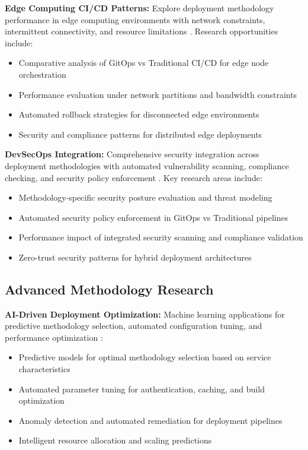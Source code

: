 \textbf{Edge Computing CI/CD Patterns:} Explore deployment methodology performance in edge computing environments with network constraints, intermittent connectivity, and resource limitations \cite{edge_computing,distributed_deployment}. Research opportunities include:
\begin{itemize}
\item Comparative analysis of GitOps vs Traditional CI/CD for edge node orchestration
\item Performance evaluation under network partitions and bandwidth constraints
\item Automated rollback strategies for disconnected edge environments
\item Security and compliance patterns for distributed edge deployments
\end{itemize}

\textbf{DevSecOps Integration:} Comprehensive security integration across deployment methodologies with automated vulnerability scanning, compliance checking, and security policy enforcement \cite{devsecops,security_automation}. Key research areas include:
\begin{itemize}
\item Methodology-specific security posture evaluation and threat modeling
\item Automated security policy enforcement in GitOps vs Traditional pipelines
\item Performance impact of integrated security scanning and compliance validation
\item Zero-trust security patterns for hybrid deployment architectures
\end{itemize}

\subsection{Advanced Methodology Research}
\label{subsec:advanced_methodology}

\textbf{AI-Driven Deployment Optimization:} Machine learning applications for predictive methodology selection, automated configuration tuning, and performance optimization \cite{ai_driven_optimization,ml_for_devops}:
\begin{itemize}
\item Predictive models for optimal methodology selection based on service characteristics
\item Automated parameter tuning for authentication, caching, and build optimization
\item Anomaly detection and automated remediation for deployment pipelines
\item Intelligent resource allocation and scaling predictions
\end{itemize}

